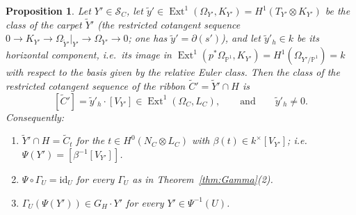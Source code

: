 \documentclass[11pt,reqno]{amsart}
\theoremstyle{plain}
\newtheorem{proposition}[theorem]{Proposition}
\theoremstyle{definition}
\newcommand{\PP}{\mathbb{P}}
\newcommand{\Ext}{\operatorname{Ext}}
\newcommand{\id}{\mathrm{id}}
\newcommand{\Yt}{\widetilde{Y}}
\newcommand{\Ct}{\widetilde{C}}
\newcommand{\yt}{\tilde{y}}
\newcommand{\SC}{\mathcal{S}_C}
\newcommand{\GH}{G_H}
\begin{document}
\begin{proposition}\label{prop:section}
Let $Y'\in\SC$, let $\yt'\in\Ext^1(\Omega_{Y'},K_{Y'})=H^1(T_{Y'}\otimes K_{Y'})$ be the class of the carpet $\Yt'$ (the restricted cotangent sequence $0\to K_{Y'}\to\Omega_{\Yt'}|_{Y'}\to\Omega_{Y'}\to0$; one has $\yt'=\partial(s')$), and let $\yt'_h\in k$ be its horizontal component, i.e.\ its image in $\Ext^1(p^*\Omega_{\PP^1},K_{Y'})=H^1(\Omega_{Y'/\PP^1})=k$ with respect to the basis given by the relative Euler class. Then the class of the restricted cotangent sequence of the ribbon $\Ct'=\Yt'\cap H$ is
\[
[\Ct']=\yt'_h\cdot[V_{Y'}]\in\Ext^1(\Omega_C,L_C),\qquad\text{and}\qquad \yt'_h\neq 0 .
\]
Consequently:
\begin{enumerate}
\item $\Yt'\cap H=\Ct_t$ for the $t\in H^0(N_C\otimes L_C)$ with $\beta(t)\in k^{\times}[V_{Y'}]$; i.e.\ $\Psi(Y')=[\beta^{-1}[V_{Y'}]]$.
\item $\Psi\circ\Gamma_U=\id_U$ for every $\Gamma_U$ as in Theorem~\ref{thm:Gamma}(2).
\item $\Gamma_U(\Psi(Y'))\in\GH\cdot Y'$ for every $Y'\in\Psi^{-1}(U)$.
\end{enumerate}
\end{proposition}
\end{document}
